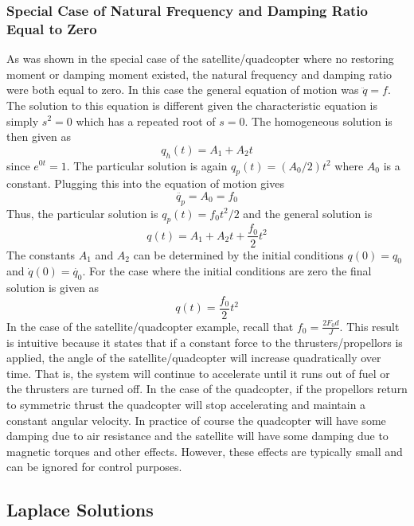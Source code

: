 \subsubsection{Special Case of Natural Frequency and Damping Ratio Equal to Zero}

As was shown in the special case of the satellite/quadcopter where no restoring moment or damping moment existed, the natural frequency and damping ratio were both equal to zero. In this case the general equation of motion was $\ddot{q} = f$. The solution to this equation is different given the characteristic equation is simply $s^2=0$ which has a repeated root of $s=0$. The homogeneous solution is then given as
\begin{equation}
    q_h(t) = A_1 + A_2 t
\end{equation}
since $e^{0t}=1$. The particular solution is again $q_p(t)=(A_0/2)t^2$ where $A_0$ is a constant. Plugging this into the equation of motion gives
\begin{equation}
    \ddot{q_p} = A_0 = f_0
\end{equation}
Thus, the particular solution is $q_p(t)=f_0 t^2/2$ and the general solution is
\begin{equation}
    q(t) = A_1 + A_2 t + \frac{f_0}{2} t^2
\end{equation}
The constants $A_1$ and $A_2$ can be determined by the initial conditions $q(0)=q_0$ and $\dot{q}(0)=\dot{q_0}$. For the case where the initial conditions are zero the final solution is given as 
\begin{equation}
    q(t) = \frac{f_0}{2} t^2
\end{equation}
In the case of the satellite/quadcopter example, recall that $f_0 = \frac{2F_0 d}{J}$. This result is intuitive because it states that if a constant force to the thrusters/propellors is applied, the angle of the satellite/quadcopter will increase quadratically over time. That is, the system will continue to accelerate until it runs out of fuel or the thrusters are turned off. In the case of the quadcopter, if the propellors return to symmetric thrust the quadcopter will stop accelerating and maintain a constant angular velocity. In practice of course the quadcopter will have some damping due to air resistance and the satellite will have some damping due to magnetic torques and other effects. However, these effects are typically small and can be ignored for control purposes.

\subsection{Laplace Solutions}

